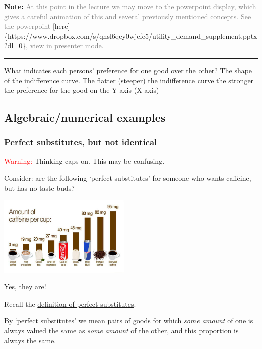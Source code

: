 \documentclass[]{article}
\begin{document}
\textbf{Note:}
\textcolor{gray}{At this point in the lecture we may move to the powerpoint display, which gives a careful animation of this and several previously mentioned concepts. See the powerpoint}
{[}here{]}\{https://www.dropbox.com/s/qhsl6qey0wjcfe5/utility\_demand\_supplement.pptx?dl=0\},
\textcolor{gray}{view in presenter mode.}

\begin{center}\rule{0.5\linewidth}{\linethickness}\end{center}

What indicates each persons' preference for one good over the other? The
shape of the indifference curve. The flatter (steeper) the indifference
curve the stronger the preference for the good on the Y-axis (X-axis)

\hypertarget{algebraicnumerical-examples}{%
\subsection{Algebraic/numerical
examples}\label{algebraicnumerical-examples}}

\hypertarget{perfect-substitutes-but-not-identical}{%
\subsubsection{Perfect substitutes, but not
identical}\label{perfect-substitutes-but-not-identical}}

\textcolor{red}{Warning:} Thinking caps on. This may be confusing.

Consider: are the following `perfect substitutes' for someone who wants
caffeine, but has no taste buds?

\includegraphics[height=1.5in]{picsfigs/amount-of-caffeine-in-drinks.jpg}

Yes, they are!

Recall the \protect\hyperlink{perfect-sub-comp}{definition of perfect
substitutes}.

By `perfect substitutes' we mean pairs of goods for which \emph{some
amount} of one is always valued the same as \emph{some amount} of the
other, and this proportion is always the same.
\end{document}
